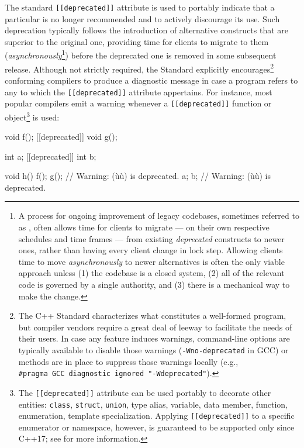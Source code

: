 The standard \lstinline![[deprecated]]! attribute is used to portably
indicate that a particular  is no longer recommended and
to actively discourage its use. Such deprecation typically follows the
introduction of alternative constructs that are
superior to the original one, providing time for clients to migrate to
them (\emph{asynchronously}{\cprotect\footnote{A process for ongoing
improvement of legacy codebases, sometimes referred to as
, often allows time for clients to
migrate --- on their own respective schedules and time frames --- from
existing \emph{deprecated} constructs to newer ones, rather than
having every client change in lock step. Allowing clients time to move
\emph{asynchronously} to newer alternatives is often the only viable
approach unless (1) the codebase is a closed system, (2) all of the
relevant code is governed by a single authority, and (3) there is a mechanical way to make the change.}}) before the deprecated
one is removed in some subsequent release. Although not strictly
required, the Standard explicitly encourages{\cprotect\footnote{The C++
Standard characterizes what constitutes a well-formed program, but
compiler vendors require a great deal of leeway to facilitate the
needs of their users. In case any feature induces warnings,
command-line options are typically available to disable those warnings
(\lstinline!-Wno-deprecated! in GCC) or methods are in place to suppress those warnings
locally (e.g.,
  \lstinline!#pragma!~\lstinline!GCC!~\lstinline!diagnostic!~\lstinline!ignored!~\lstinline!"-Wdeprecated"!).}}
conforming compilers to produce a diagnostic message in case a program
refers to any  to which the \lstinline![[deprecated]]!
attribute appertains. For instance, most popular compilers emit a
warning whenever a \lstinline![[deprecated]]! function or
object{\cprotect\footnote{The \lstinline![[deprecated]]! attribute can be
used portably to decorate other entities: \lstinline!class!,
\lstinline!struct!, \lstinline!union!, type alias, variable, data member,
function, enumeration, template specialization. Applying
\lstinline![[deprecated]]! to a specific enumerator or namespace,
however, is guaranteed to be supported only since C++17; see
  \cite{smith15a} for more information.}} is used:

\begin{emcppslisting}
               void f();
[[deprecated]] void g();

               int a;
[[deprecated]] int b;

void h()
{
    f();
    g();  // Warning: (ù{}ù) is deprecated.
    a;
    b;    // Warning: (ù{}ù) is deprecated.
}
\end{emcppslisting}
    
